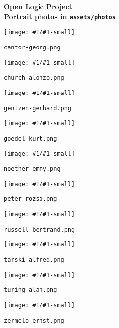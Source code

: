 \documentclass[12pt]{article}
\def\displayphoto#1{
\begin{minipage}{.5\textwidth}
  \texttt{[image: \#1/\#1-small]}
\end{minipage}
\begin{minipage}{.5\textwidth}
  \texttt{#1.png}\quad
\end{minipage}\bigskip\par}
\begin{document}
\begin{center}
\large\textbf{Open Logic Project\\
  Portrait photos in \texttt{assets/photos}}
\end{center}

\displayphoto{cantor-georg}

\displayphoto{church-alonzo}

\displayphoto{gentzen-gerhard}

\displayphoto{goedel-kurt}

\displayphoto{noether-emmy}

\displayphoto{peter-rozsa}

\displayphoto{russell-bertrand}

\displayphoto{tarski-alfred}

\displayphoto{turing-alan}

\displayphoto{zermelo-ernst}
\end{document}
